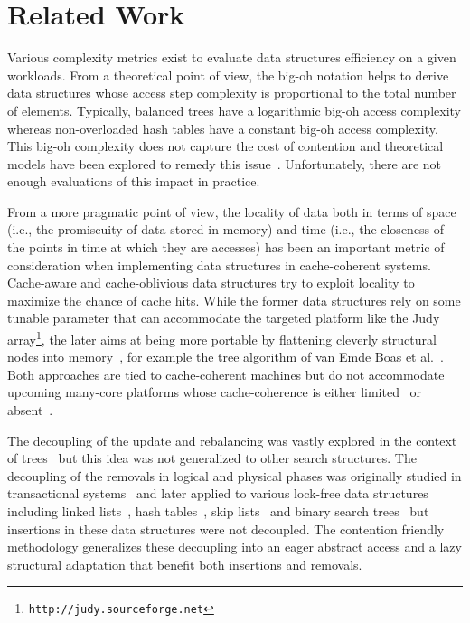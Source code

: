 \section{Related Work}\label{sec:rw}

Various complexity metrics exist to evaluate data structures efficiency on a given workloads. 
From a theoretical point of view, the big-oh notation helps to derive data structures whose access step 
complexity is proportional to the total number of elements.
Typically, balanced trees have a logarithmic big-oh access complexity whereas non-overloaded hash 
tables have a constant big-oh access complexity.
This big-oh complexity does not capture the cost of contention and theoretical models have been 
explored to remedy this issue~\cite{DHW97}. Unfortunately, there are not enough evaluations of this 
impact in practice. 

From a more pragmatic point of view, the locality of data both in terms of space (i.e., the promiscuity of 
data stored in memory) and time (i.e., 
the closeness of the points in time at which they are accesses) has been an important metric of 
consideration when implementing data structures in cache-coherent systems.
Cache-aware and cache-oblivious data structures try to exploit locality to maximize the chance of cache 
hits. While the former data structures rely on some tunable parameter that can accommodate the 
targeted platform like the Judy array\footnote{\texttt{http://judy.sourceforge.net}}, the later aims at being 
more portable by flattening cleverly structural nodes into memory~\cite{FLPR99}, for example the tree algorithm 
of van Emde Boas et al.~\cite{vEKZ76}. Both approaches are tied to cache-coherent machines but do 
not accommodate upcoming many-core platforms whose cache-coherence is either 
limited~\cite{WGH+07} or absent~\cite{MRL+10}. 

The decoupling of the update and rebalancing was vastly explored in the context 
of trees~\cite{GS78,Kes83,NSW87,NS98,UR84,IRISAppr,Bal06,CGR12} 
but this idea was 
not generalized to other search structures.
The decoupling of the removals in logical and physical phases was originally studied in transactional systems~\cite{Moh90}
and later applied to various lock-free data structures including linked lists~\cite{Har01}, hash tables~\cite{Mic02}, skip lists~\cite{Fra03,FR04} and binary search trees~\cite{EFRB10}
but insertions in these data structures were not decoupled.
The contention friendly methodology generalizes these decoupling into an eager abstract access and a lazy structural adaptation that benefit
both insertions and removals.

